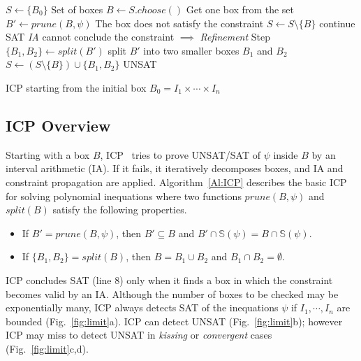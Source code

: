 \documentclass[runningheads,a4paper,oribibl]{llncs}
\begin{document}
\begin{algorithm}
\begin{algorithmic}[1]
\State $S \gets \{B_0\}$ \Comment Set of boxes
  \State $B \gets S.choose()$ \Comment Get one box from the set
  \State $B' \gets prune(B, \psi)$
   \Comment The box does not satisfy the constraint
  	\State $S \gets S \setminus \{B\}$
  	\State continue
  	\State \Return SAT
  \Else \Comment \emph{IA} cannot conclude the constraint $\implies$ \emph{Refinement} Step
  	\State $\{B_1, B_2\} \gets split(B')$ \Comment split $B'$ into two smaller boxes $B_1$ and $B_2$	
  	\State $S \gets (S \setminus \{B\}) \cup \{B_1, B_2\}$
  \EndIf
\EndWhile
\State \Return UNSAT
\end{algorithmic}
\caption{ICP starting from the initial box $B_0 = I_1 \times \cdots \times I_n$}
\label{Al:ICP}
\end{algorithm}


\subsection{ICP Overview}

\sloppy  
Starting with a box $B$, ICP~\cite{benhamou:hal-00480814} tries to prove
UNSAT/SAT of $\psi$ inside $B$ by an interval arithmetic (IA).
If it fails, it iteratively decomposes boxes, and IA and constraint propagation are applied. 
Algorithm~\ref{Al:ICP} describes the basic ICP for solving polynomial inequations
where two functions $prune(B,\psi)$ and $split(B)$ satisfy the following properties.
\begin{itemize}
\item If $B' = prune (B, \psi)$,
  then $B' \subseteq B $ and $ B' \cap \mathbb{S}(\psi) = B \cap \mathbb{S}(\psi)$. 
\item If $\{B_1, B_2\} = split (B)$,
  then $B = B_1 \cup B_2$ and $B_1 \cap B_2 = \emptyset$. 
\end{itemize}

ICP concludes SAT (line 8) only when it finds a box
in which the constraint becomes valid by an IA. 
Although the number of boxes to be checked may be exponentially many, 
ICP always detects SAT of the inequations $\psi$
if $I_1, \cdots, I_n$ are bounded (Fig.~\ref{fig:limit}a). 
ICP can detect UNSAT (Fig.~\ref{fig:limit}b); however 
ICP may miss to detect UNSAT in \emph{kissing} or 
\emph{convergent} cases (Fig.~\ref{fig:limit}c,d).
\end{document}

